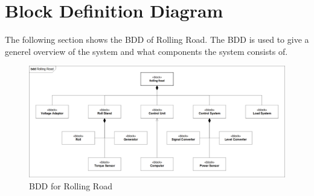 \section{Block Definition Diagram}
The following section shows the BDD of Rolling Road. The BDD is used to give a generel overview of the system and what components the system consists of. 
\begin{figure}[H]
	\centering
	\includegraphics[width=1\linewidth]{Architecture/Diagrams/BDD_RR}
	\caption{BDD for Rolling Road}
	\label{fig:RR_BDD}
\end{figure}